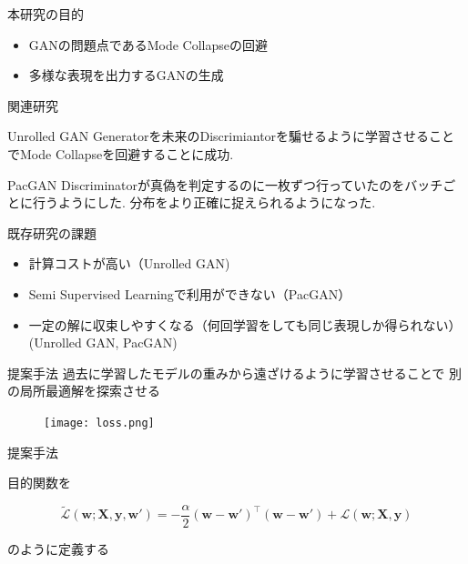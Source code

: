 \documentclass[dvipdfmx,12pt,unicode]{beamer}
\begin{document}
\begin{frame}{本研究の目的}
  \begin{itemize}
  \item GANの問題点であるMode Collapseの回避
  \item 多様な表現を出力するGANの生成
  \end{itemize}
\end{frame}

\begin{frame}{関連研究}

  \begin{block}{Unrolled GAN\cite{unrolled}}
    Generatorを未来のDiscrimiantorを騙せるように学習させることでMode Collapseを回避することに成功.
  \end{block}

  \begin{block}{PacGAN\cite{pacgan}}
    Discriminatorが真偽を判定するのに一枚ずつ行っていたのをバッチごとに行うようにした. 分布をより正確に捉えられるようになった.
  \end{block}
\end{frame}

\begin{frame}{既存研究の課題}
  \begin{itemize}
  \item 計算コストが高い（Unrolled GAN)
  \item Semi Supervised Learningで利用ができない（PacGAN）
  \item 一定の解に収束しやすくなる（何回学習をしても同じ表現しか得られない）(Unrolled GAN, PacGAN)
  \end{itemize}
\end{frame}

\begin{frame}{提案手法}
  過去に学習したモデルの重みから遠ざけるように学習させることで
  別の局所最適解を探索させる

  \begin{figure}[htb]
    \centering    
    \texttt{[image: loss.png]}
  \end{figure}  
\end{frame}

\begin{frame}{提案手法}

目的関数を

\begin{equation}
  \label{unshare}
  \tilde{\mathcal{L}}(\pmb{w}; \pmb{X}, \pmb{y}, \pmb{w}') =
  -\frac{\alpha}{2} (\pmb{w} - \pmb{w}')^{\top}(\pmb{w} - \pmb{w}') + \mathcal{L}(\pmb{w}; \pmb{X}, \pmb{y})  
\end{equation}


のように定義する
  
\end{frame}
\end{document}
